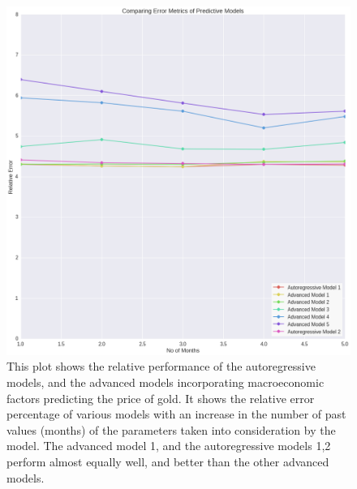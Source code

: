 \documentclass[runningheads]{llncs}
\begin{document}
\begin{figure}
\centering
\includegraphics[width=\textwidth]{ModelComparison_Gold.png}
\caption{This plot shows the relative performance of the autoregressive models, and the advanced models incorporating macroeconomic factors predicting the price of gold. It shows the relative error percentage of various models with an increase in the number of past values (months) of the parameters taken into consideration by the model. The advanced model 1, and the autoregressive models 1,2 perform almost equally well, and better than the other advanced models. }
\label{fig:ModelComparison_Gold.png}
\end{figure}
\end{document}
